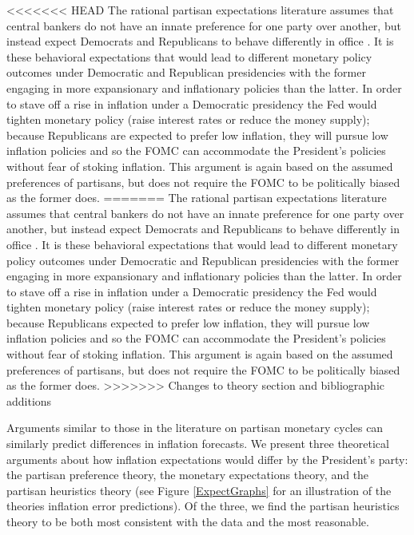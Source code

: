 \documentclass[a4paper]{article}\usepackage{graphicx, color}
\begin{document}
<<<<<<< HEAD
The rational partisan expectations literature assumes that central bankers do not have an innate preference for one party over another, but instead expect Democrats and Republicans to behave differently in office \citep{Alesina1991,Hibbs1994}. It is these behavioral expectations that would lead to different monetary policy outcomes under Democratic and Republican presidencies with the former engaging in more expansionary and inflationary policies than the latter. In order to stave off a rise in inflation under a Democratic presidency the Fed would tighten monetary policy (raise interest rates or reduce the money supply); because Republicans are expected to prefer low inflation, they will pursue low inflation policies and so the FOMC can accommodate the President's policies without fear of stoking inflation. This argument is again based on the assumed preferences of partisans, but does not require the FOMC to be politically biased as the former does. 
=======
The rational partisan expectations literature assumes that central bankers do not have an innate preference for one party over another, but instead expect Democrats and Republicans to behave differently in office \citep{Alesina1991,Hibbs1994}. It is these behavioral expectations that would lead to different monetary policy outcomes under Democratic and Republican presidencies with the former engaging in more expansionary and inflationary policies than the latter. In order to stave off a rise in inflation under a Democratic presidency the Fed would tighten monetary policy (raise interest rates or reduce the money supply); because Republicans expected to prefer low inflation, they will pursue low inflation policies and so the FOMC can accommodate the President's policies without fear of stoking inflation. This argument is again based on the assumed preferences of partisans, but does not require the FOMC to be politically biased as the former does. 
>>>>>>> Changes to theory section and bibliographic additions

Arguments similar to those in the literature on partisan monetary cycles can similarly predict differences in inflation forecasts. We present three theoretical arguments about how inflation expectations would differ by the President's party: the partisan preference theory, the monetary expectations theory, and the partisan heuristics theory (see Figure \ref{ExpectGraphs} for an illustration of the theories inflation error predictions). Of the three, we find the partisan heuristics theory to be both most consistent with the data and the most reasonable.
\end{document}
